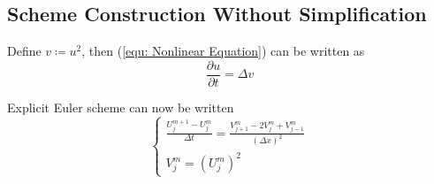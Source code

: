 \documentclass[a4paper]{article}
\begin{document}
\subsection{Scheme Construction Without Simplification}
Define $v \coloneqq u^2$, then (\ref{equ: Nonlinear Equation}) can be written as
\begin{equation}
    \frac{\partial u}{\partial t} = \Delta v
\end{equation}

Explicit Euler scheme can now be written
\begin{equation}
    \begin{cases}
        \frac{U_j^{m+1} - U_j^m}{\Delta t} = \frac{V_{j+1}^m - 2 V_j^m + V_{j-1}^m}{\left( \Delta x \right)^2} \\
        V_j^m = \left( U_j^m \right)^2
    \end{cases}
\end{equation}
\end{document}
